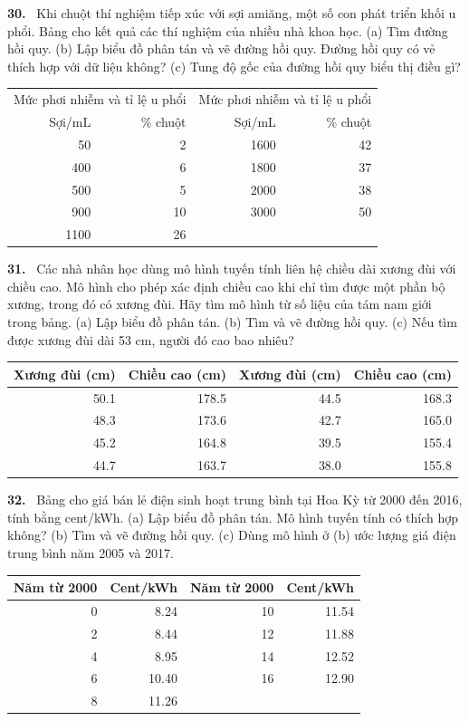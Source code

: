 \documentclass[12pt,a4paper]{article}
\newcommand{\bt}[1]{\par\smallskip\noindent\textbf{#1.}\ }
\begin{document}
\bt{30} Khi chuột thí nghiệm tiếp xúc với sợi amiăng, một số con phát triển khối u phổi. Bảng cho kết quả các thí nghiệm của nhiều nhà khoa học. (a) Tìm đường hồi quy. (b) Lập biểu đồ phân tán và vẽ đường hồi quy. Đường hồi quy có vẻ thích hợp với dữ liệu không? (c) Tung độ gốc của đường hồi quy biểu thị điều gì?
\begin{center}\begin{tabular}{rr@{\quad}rr}\toprule
\multicolumn{2}{c}{Mức phơi nhiễm và tỉ lệ u phổi}&\multicolumn{2}{c}{Mức phơi nhiễm và tỉ lệ u phổi}\\
Sợi/mL&\% chuột&Sợi/mL&\% chuột\\\midrule
50&2&1600&42\\400&6&1800&37\\500&5&2000&38\\900&10&3000&50\\1100&26&&\\\bottomrule\end{tabular}\end{center}
\bt{31} Các nhà nhân học dùng mô hình tuyến tính liên hệ chiều dài xương đùi với chiều cao. Mô hình cho phép xác định chiều cao khi chỉ tìm được một phần bộ xương, trong đó có xương đùi. Hãy tìm mô hình từ số liệu của tám nam giới trong bảng. (a) Lập biểu đồ phân tán. (b) Tìm và vẽ đường hồi quy. (c) Nếu tìm được xương đùi dài 53 cm, người đó cao bao nhiêu?
\begin{center}\begin{tabular}{rr@{\qquad}rr}\toprule
Xương đùi (cm)&Chiều cao (cm)&Xương đùi (cm)&Chiều cao (cm)\\\midrule
50.1&178.5&44.5&168.3\\48.3&173.6&42.7&165.0\\45.2&164.8&39.5&155.4\\44.7&163.7&38.0&155.8\\\bottomrule\end{tabular}\end{center}
\bt{32} Bảng cho giá bán lẻ điện sinh hoạt trung bình tại Hoa Kỳ từ 2000 đến 2016, tính bằng cent/kWh. (a) Lập biểu đồ phân tán. Mô hình tuyến tính có thích hợp không? (b) Tìm và vẽ đường hồi quy. (c) Dùng mô hình ở (b) ước lượng giá điện trung bình năm 2005 và 2017.
\begin{center}\begin{tabular}{rr@{\qquad}rr}\toprule
Năm từ 2000&Cent/kWh&Năm từ 2000&Cent/kWh\\\midrule
0&8.24&10&11.54\\2&8.44&12&11.88\\4&8.95&14&12.52\\6&10.40&16&12.90\\8&11.26&&\\\bottomrule\end{tabular}\end{center}
\end{document}
